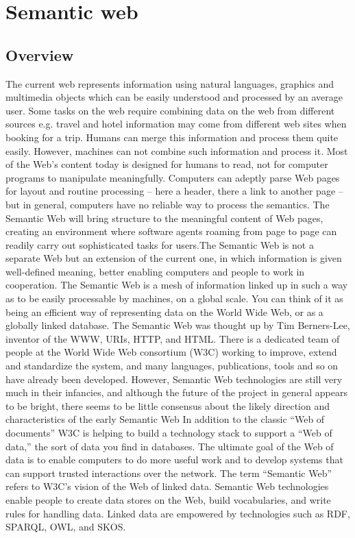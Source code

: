 \documentclass[a4paper,12pt,oneside]{report}
\begin{document}
{\section{Semantic web}
\subsection{Overview}
{       The current web represents information using natural languages, graphics and multimedia objects which can be easily understood and processed by an average user. Some tasks on the web require combining data on the web from different sources e.g. travel and hotel information may come from different web sites when booking for a trip. Humans can merge this information and process them quite easily. However, machines can not combine such information and process it. Most of the Web’s content today is designed for humans to read, not for computer programs to manipulate meaningfully. Computers can adeptly parse Web pages for layout and routine processing – here a header, there a link to another page – but in general, computers have no reliable way to process the semantics.
The Semantic Web will bring structure to the meaningful content of Web pages, creating an environment where software agents roaming from page to page can readily carry out sophisticated tasks for users.The Semantic Web is not a separate Web but an extension of the current one, in which information is given well-defined meaning, better enabling computers and people to work in cooperation.
The Semantic Web is a mesh of information linked up in such a way as to be easily processable by machines, on a global scale. You can think of it as being an efficient way of representing data on the World Wide Web, or as a globally linked database.
The Semantic Web was thought up by Tim Berners-Lee, inventor of the WWW, URIs, HTTP, and HTML. There is a dedicated team of people at the World Wide Web consortium (W3C) working to improve, extend and standardize the system, and many languages, publications, tools and so on have already been developed. However, Semantic Web technologies are still very much in their infancies, and although the future of the project in general appears to be bright, there seems to be little consensus about the likely direction and characteristics of the early Semantic Web
      In addition to the classic “Web of documents” W3C is helping to build a technology stack to support a “Web of data,” the sort of data you find in databases. The ultimate goal of the Web of data is to enable computers to do more useful work and to develop systems that can support trusted interactions over the network. The term “Semantic Web” refers to W3C’s vision of the Web of linked data. Semantic Web technologies enable people to create data stores on the Web, build vocabularies, and write rules for handling data. Linked data are empowered by technologies such as RDF, SPARQL, OWL, and SKOS.}
}
\end{document}
